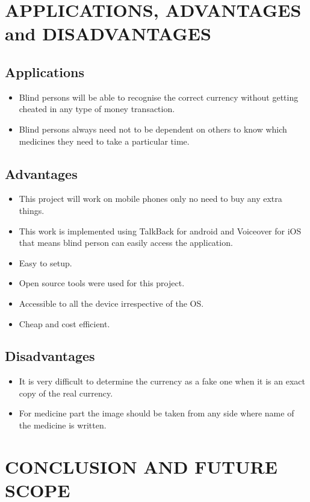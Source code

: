 \chapter{APPLICATIONS, ADVANTAGES and DISADVANTAGES}
\section{Applications}
\newline
\begin{itemize}
\item Blind persons will be able to recognise the correct
currency without getting cheated in any type of money transaction.

\item Blind persons always need not to be dependent on others to know which medicines they need to take a particular time. 
\end{itemize}
\section{Advantages}
\newline\begin{itemize}
\item This project will work on mobile phones only no need to buy any extra things. 
\item This work is implemented using TalkBack for android and Voiceover for iOS that means blind person can easily access the application. 
\item Easy to setup. 
\item Open source tools were used for this project.
\item Accessible to all the device irrespective of the OS. 
\item Cheap and cost efficient. 
\end{itemize}
\section{Disadvantages}
\newline
\begin{itemize}
\item It is very difficult to determine the currency as a fake one when it is an exact copy of the real currency.
\item For medicine part the image should be taken from any side where name of the medicine is written.
\end{itemize}
\newpage
\chapter{CONCLUSION AND FUTURE SCOPE}
